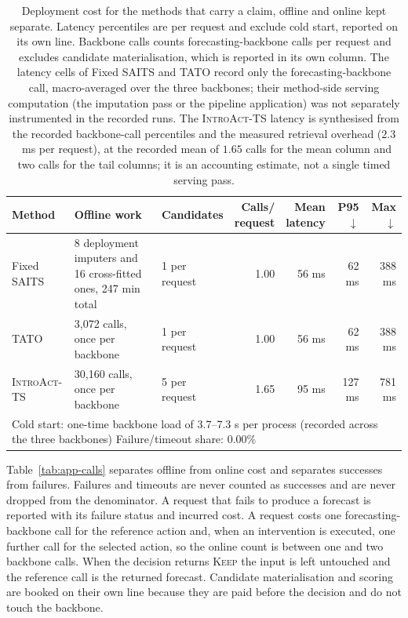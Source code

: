 \documentclass{article}
\newcommand{\introact}{\textsc{IntroAct-TS}}
\begin{document}
\begin{table}[t]
  \caption{Deployment cost for the methods that carry a claim, offline and online kept
  separate. Latency percentiles are per request and exclude cold start, reported on its own
  line. Backbone calls counts forecasting-backbone calls per request and excludes candidate
  materialisation, which is reported in its own column. The latency cells of Fixed SAITS and
  TATO record only the forecasting-backbone call, macro-averaged over the three backbones;
  their method-side serving computation (the imputation pass or the pipeline application) was
  not separately instrumented in the recorded runs. The \introact{} latency is synthesised
  from the recorded backbone-call percentiles and the measured retrieval overhead
  ($2.3$~ms per request), at the recorded mean of $1.65$ calls for the mean column and two
  calls for the tail columns; it is an accounting estimate, not a single timed serving pass.}
  \label{tab:app-efficiency}
  \centering
  \small
  \setlength{\tabcolsep}{4pt}
\begin{tabularx}{\textwidth}{@{}lXXrrrr@{}}
    \toprule
    Method & Offline work & Candidates & \shortstack[r]{Calls/\\request} & \shortstack[r]{Mean\\latency} & P95 $\downarrow$ & Max $\downarrow$ \\
    \midrule
    Fixed SAITS           & 8 deployment imputers and 16 cross-fitted ones, 247 min total     & 1 per request     & 1.00     & 56 ms     & 62 ms     & 388 ms \\
    TATO               & 3,072 calls, once per backbone   & 1 per request   & 1.00   & 56 ms   & 62 ms   & 388 ms \\
    \rowcolor{bestgray}\introact{} & 30,160 calls, once per backbone & 5 per request & 1.65 & 95 ms & 127 ms & 781 ms \\
    \midrule
    \multicolumn{7}{p{0.97\textwidth}}{\footnotesize Cold start: one-time backbone load of 3.7--7.3 s per process (recorded across the three backbones) \quad
    Failure/timeout share: 0.00\%} \\
    \bottomrule
  \end{tabularx}
\end{table}

Table~\ref{tab:app-calls} separates offline from online cost and separates successes from
failures. Failures and timeouts are never counted as successes and are never dropped from the
denominator. A request that fails to produce a forecast is reported with its failure status and incurred cost. A request costs one forecasting-backbone call for the reference action
and, when an intervention is executed, one further call for the selected action, so the online
count is between one and two backbone calls. When the decision returns \textsc{Keep} the input
is left untouched and the reference call is the returned forecast. Candidate materialisation
and scoring are booked on their own line because they are paid before the decision and do not
touch the backbone.
\end{document}
